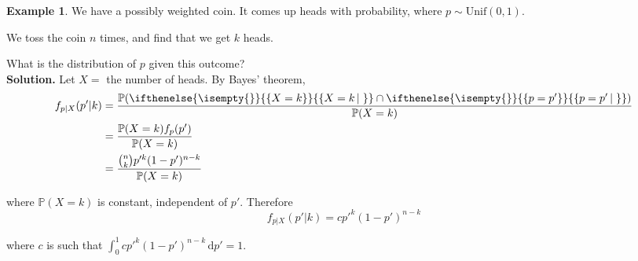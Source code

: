 \documentclass[a4paper,11pt]{amsbook}
\theoremstyle{definition}
\newtheorem{example}{\hspace{-2em} \color{darkblue} Example}[chapter]
\theoremstyle{remark}
\renewcommand{\P}{\mathbb{P}}
\newcommand\0{\varnothing}
\newcommand\dt[1][t]{\,\mathrm{d}#1}
\newcommand\Unif{\text{Unif}}
\newcommand\set[2][]
{
    \ifthenelse{\isempty{#1}}
    {
        \left\{#2\right\}
    }
    {
        \left\{#2\left|\,#1\right.\right\}
    }
}
\begin{document}
    \begin{example}
        We have a possibly weighted coin.
        It comes up heads with probability, where $p\sim\Unif(0,1)$.

        We toss the coin $n$ times, and find that we get $k$ heads.

        What is the distribution of $p$ given this outcome?\\
        \textbf{Solution.} Let $X=$ the number of heads. By Bayes' theorem,
        \begin{align*}
            f_{p|X}(p'|k)&=\frac{\P(\set{X=k}\cap\set{p=p'})}{\P(X=k)} \\
            &=\frac{\P(X=k)f_p(p')}{\P(X=k)} \\
            &=\frac{\binom nk p'^k(1-p')^{n-k}}{\P(X=k)}
        \end{align*}

        where $\P(X=k)$ is constant, independent of $p'$.
        Therefore $$f_{p|X}(p'|k)=cp'^k(1-p')^{n-k}$$

        where $c$ is such that $\int_0^1cp'^k(1-p')^{n-k}\dt[p']=1$.
    \end{example}
\end{document}
